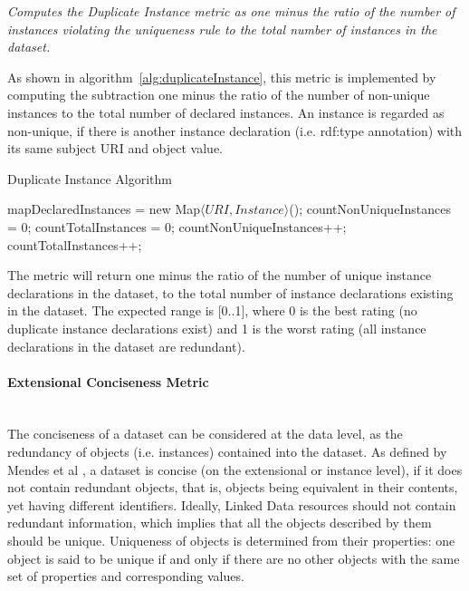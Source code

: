{{%
\begin{mdframed}[style=metricdefinition]
\emph{Computes the Duplicate Instance metric as one minus the ratio of the number of instances violating the uniqueness rule to the total number of instances in the dataset.}
\end{mdframed}

As shown in algorithm~\ref{alg:duplicateInstance}, this metric is implemented by computing the subtraction one minus the ratio of the number of non-unique instances to the total number of declared instances. An instance is regarded as non-unique, if there is another instance declaration (i.e. rdf:type annotation) with its same subject URI and object value.
\begin{algorithm}
\caption{Duplicate Instance Algorithm} \label{alg:duplicateInstance}
\begin{algorithmic}[1]
\State mapDeclaredInstances = new Map$\langle URI, Instance\rangle$();
\State countNonUniqueInstances = 0;
\State countTotalInstances = 0;
\EndProcedure
{}
countNonUniqueInstances++; 
\EndIf
\State countTotalInstances++;  ~\\
\EndProcedure
\end{algorithmic}
\end{algorithm}
The metric will return one minus the ratio of the number of unique instance declarations in the dataset, to the total number of instance declarations existing in the dataset. The expected range is [0..1], where 0 is the best rating (no duplicate instance declarations exist) and 1 is the worst rating (all instance declarations in the dataset are redundant).


\paragraph{Extensional Conciseness Metric} ~\\ 
The conciseness of a dataset can be considered at the data level, as the redundancy of objects (i.e. instances) contained into the dataset. As defined by Mendes et al \cite{Mendes2012}, a dataset is concise (on the extensional or instance level), if it does not contain redundant objects, that is, objects being equivalent in their contents, yet having different identifiers.
Ideally, Linked Data resources should not contain redundant information, which implies that all the objects described by them should be unique. Uniqueness of objects is determined from their properties: one object is said to be unique if and only if there are no other objects with the same set of properties and corresponding values.

}}
